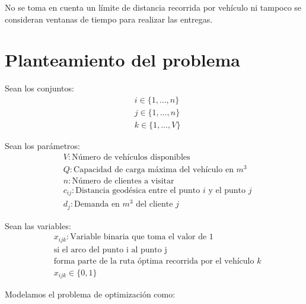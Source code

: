 \documentclass[journal]{IEEEtran}
\begin{document}
        No se toma en cuenta un límite de distancia recorrida por vehículo ni tampoco se consideran ventanas de tiempo para realizar las entregas.
    
    \section{Planteamiento del problema} \label{sec:problem}

        Sean los conjuntos:
        \begin{align*}
            & i \in \{1, \dots, n \} \\
            & j \in \{1, \dots, n \} \\
            & k \in \{1, \dots, V \}
        \end{align*}
        
        Sean los parámetros:
        \begin{align*}
            & V: \text{Número de vehículos disponibles} \\
            & Q: \text{Capacidad de carga máxima del vehículo en } m^3 \\
            & n: \text{Número de clientes a visitar} \\
            & c_{ij}: \text{Distancia geodésica entre el punto } i \text{ y el punto } j \\
            & d_j: \text{Demanda en } m^3 \text{ del cliente } j 
        \end{align*}
        
        Sean las variables:
        \begin{align*}
            & x_{ijk}: \text{Variable binaria que toma el valor de 1}\\
            & \text{si el arco del punto i al punto j} \\
            & \text{forma parte de la ruta óptima recorrida por el vehículo } k \\
            & x_{ijk} \in \{0, 1\}
        \end{align*}
        
        Modelamos el problema de optimización como:
        
\end{document}
